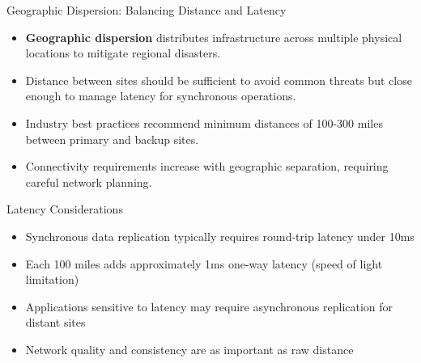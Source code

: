 \documentclass{beamer}
\begin{document}
\begin{frame}{Geographic Dispersion: Balancing Distance and Latency}
    \begin{itemize}
        \item \textbf{Geographic dispersion} distributes infrastructure across multiple physical locations to mitigate regional disasters.
        \item Distance between sites should be sufficient to avoid common threats but close enough to manage latency for synchronous operations.
        \item Industry best practices recommend minimum distances of 100-300 miles between primary and backup sites.
        \item Connectivity requirements increase with geographic separation, requiring careful network planning.
    \end{itemize}
    
    \begin{alertblock}{Latency Considerations}
        \small
        \begin{itemize}
            \item Synchronous data replication typically requires round-trip latency under 10ms
            \item Each 100 miles adds approximately 1ms one-way latency (speed of light limitation)
            \item Applications sensitive to latency may require asynchronous replication for distant sites
            \item Network quality and consistency are as important as raw distance
        \end{itemize}
    \end{alertblock}
\end{frame}
\end{document}
